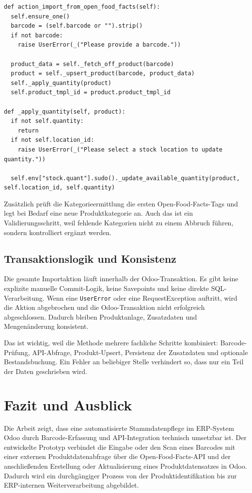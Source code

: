 \documentclass[12pt,a4paper]{article}
\begin{document}
\begin{lstlisting}[caption={Validierung, Fehlermeldungen und Mengenbuchung}, label={lst:off-validation}]
def action_import_from_open_food_facts(self):
  self.ensure_one()
  barcode = (self.barcode or "").strip()
  if not barcode:
    raise UserError(_("Please provide a barcode."))

  product_data = self._fetch_off_product(barcode)
  product = self._upsert_product(barcode, product_data)
  self._apply_quantity(product)
  self.product_tmpl_id = product.product_tmpl_id

def _apply_quantity(self, product):
  if not self.quantity:
    return
  if not self.location_id:
    raise UserError(_("Please select a stock location to update quantity."))

  self.env["stock.quant"].sudo()._update_available_quantity(product, self.location_id, self.quantity)
\end{lstlisting}

Zusätzlich prüft die Kategorieermittlung die ersten Open-Food-Facts-Tags und legt bei Bedarf eine neue Produktkategorie an. Auch das ist ein Validierungsschritt, weil fehlende Kategorien nicht zu einem Abbruch führen, sondern kontrolliert ergänzt werden.

\subsection{Transaktionslogik und Konsistenz}

Die gesamte Importaktion läuft innerhalb der Odoo-Transaktion. Es gibt keine explizite manuelle Commit-Logik, keine Savepoints und keine direkte SQL-Verarbeitung. Wenn eine \texttt{UserError} oder eine RequestException auftritt, wird die Aktion abgebrochen und die Odoo-Transaktion nicht erfolgreich abgeschlossen. Dadurch bleiben Produktanlage, Zusatzdaten und Mengenänderung konsistent.

Das ist wichtig, weil die Methode mehrere fachliche Schritte kombiniert: Barcode-Prüfung, API-Abfrage, Produkt-Upsert, Persistenz der Zusatzdaten und optionale Bestandsbuchung. Ein Fehler an beliebiger Stelle verhindert so, dass nur ein Teil der Daten geschrieben wird.

\section{Fazit und Ausblick}

Die Arbeit zeigt, dass eine automatisierte Stammdatenpflege im ERP-System Odoo durch Barcode-Erfassung und API-Integration technisch umsetzbar ist. Der entwickelte Prototyp verbindet die Eingabe oder den Scan eines Barcodes mit einer externen Produktdatenabfrage über die Open-Food-Facts-API und der anschließenden Erstellung oder Aktualisierung eines Produktdatensatzes in Odoo. Dadurch wird ein durchgängiger Prozess von der Produktidentifikation bis zur ERP-internen Weiterverarbeitung abgebildet.
\end{document}
